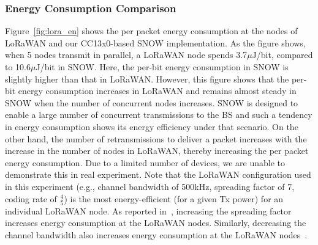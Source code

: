 \subsubsection{Energy Consumption Comparison}
Figure~\ref{fig:lora_en} shows the per packet energy consumption
at the nodes of LoRaWAN and our CC13x0-based SNOW implementation. As the figure shows, when 5 nodes transmit in parallel, a LoRaWAN node spends 3.7$\mu$J/bit, compared to 10.6$\mu$J/bit in SNOW. Here, the per-bit energy consumption in SNOW is slightly higher than that in LoRaWAN. However, this figure shows that the per-bit energy consumption increases in LoRaWAN and remains almost steady in SNOW when the number of concurrent nodes increases. SNOW is designed to enable a large number of concurrent transmissions to the BS and such a tendency in energy consumption shows its energy efficiency under that scenario. On the other hand, the number of retransmissions to deliver a packet increases with the increase in the number of nodes in LoRaWAN, thereby increasing the per packet energy consumption. Due to a limited number of devices, we are unable to demonstrate this in real experiment. Note that the LoRaWAN configuration used in this experiment (e.g., channel bandwidth of 500kHz, spreading factor of 7, coding rate of $\frac{4}{5}$) is the most energy-efficient (for a given Tx power) for an individual LoRaWAN node. 
As reported in~\cite{xu2019measurement}, increasing the spreading factor increases energy consumption at the LoRaWAN nodes. Similarly, decreasing the channel bandwidth also increases energy consumption at the LoRaWAN nodes~\cite{xu2019measurement}.


